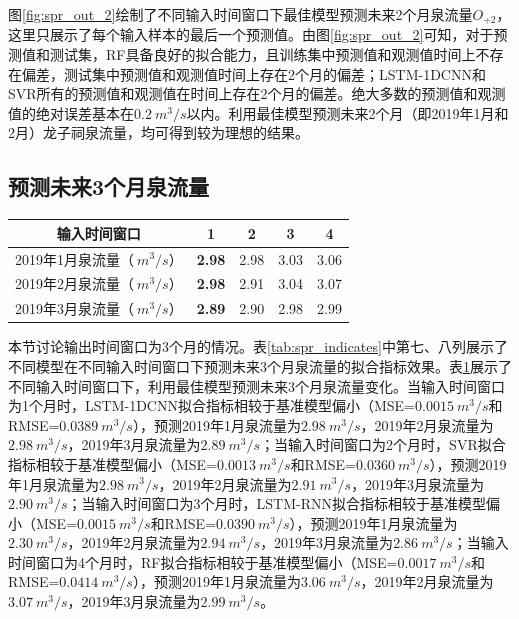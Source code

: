 图\ref{fig:spr_out_2}绘制了不同输入时间窗口下最佳模型预测未来2个月泉流量$O_{+2}$，这里只展示了每个输入样本的最后一个预测值。由图\ref{fig:spr_out_2}可知，对于预测值和测试集，RF具备良好的拟合能力，且训练集中预测值和观测值时间上不存在偏差，测试集中预测值和观测值时间上存在2个月的偏差；LSTM-1DCNN和SVR所有的预测值和观测值在时间上存在2个月的偏差。绝大多数的预测值和观测值的绝对误差基本在$\SI{0.2}{m^{3}/s}$以内。利用最佳模型预测未来2个月（即2019年1月和2月）龙子祠泉流量，均可得到较为理想的结果。

\subsection{预测未来3个月泉流量}\label{sec:spr_three}

\begin{table}[!htbp]
  \centering
  \label{tab:spr_three}
  \footnotesize
  \begin{tabular}{ccccc}
    \toprule
    输入时间窗口 & 1 & 2 & 3 & 4 \\
    \midrule
    2019年1月泉流量（$\SI{}{m^{3}/s}$）& \textbf{2.98} & 2.98 & 3.03 & 3.06  \\
    2019年2月泉流量（$\SI{}{m^{3}/s}$）& \textbf{2.98} & 2.91 & 3.04 & 3.07  \\
    2019年3月泉流量（$\SI{}{m^{3}/s}$）& \textbf{2.89} & 2.90 & 2.98 & 2.99  \\
    \bottomrule
  \end{tabular}
\end{table}

本节讨论输出时间窗口为3个月的情况。表\ref{tab:spr_indicates}中第七、八列展示了不同模型在不同输入时间窗口下预测未来3个月泉流量的拟合指标效果。表\ref{tab:spr_three}展示了不同输入时间窗口下，利用最佳模型预测未来3个月泉流量变化。当输入时间窗口为1个月时，LSTM-1DCNN拟合指标相较于基准模型偏小（MSE=$\SI{0.0015}{m^{3}/s}$和RMSE=$\SI{0.0389}{m^{3}/s}$），预测2019年1月泉流量为$\SI{2.98}{m^{3}/s}$，2019年2月泉流量为$\SI{2.98}{m^{3}/s}$，2019年3月泉流量为$\SI{2.89}{m^{3}/s}$；当输入时间窗口为2个月时，SVR拟合指标相较于基准模型偏小（MSE=$\SI{0.0013}{m^{3}/s}$和RMSE=$\SI{0.0360}{m^{3}/s}$），预测2019年1月泉流量为$\SI{2.98}{m^{3}/s}$，2019年2月泉流量为$\SI{2.91}{m^{3}/s}$，2019年3月泉流量为$\SI{2.90}{m^{3}/s}$；当输入时间窗口为3个月时，LSTM-RNN拟合指标相较于基准模型偏小（MSE=$\SI{0.0015}{m^{3}/s}$和RMSE=$\SI{0.0390}{m^{3}/s}$），预测2019年1月泉流量为$\SI{2.30}{m^{3}/s}$，2019年2月泉流量为$\SI{2.94}{m^{3}/s}$，2019年3月泉流量为$\SI{2.86}{m^{3}/s}$；当输入时间窗口为4个月时，RF拟合指标相较于基准模型偏小（MSE=$\SI{0.0017}{m^{3}/s}$和RMSE=$\SI{0.0414}{m^{3}/s}$），预测2019年1月泉流量为$\SI{3.06}{m^{3}/s}$，2019年2月泉流量为$\SI{3.07}{m^{3}/s}$，2019年3月泉流量为$\SI{2.99}{m^{3}/s}$。

